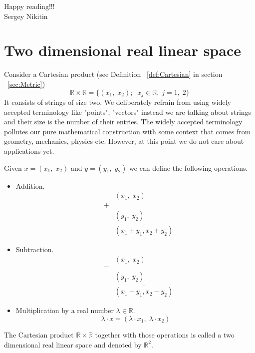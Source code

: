 \documentclass[color=black,11pt]{elegantpaper}
\begin{document}
Happy reading!!!\\
Sergey Nikitin 
 




\section{Two dimensional real linear space}
\label{sec:2space}
Consider a Cartesian product (see Definition ~\ref{def:Cartesian} in section ~\ref{sec:Metric}) 
$$
\mathbb{R} \times \mathbb{R} = \{(x_1,\;x_2);\;\;x_j \in \mathbb{R},\;j=1,\;2\}
$$  
It consists of strings of size two. We deliberately refrain from using widely accepted terminology like "points", "vectors"  instead we are talking about strings and their size is the number of their entries.  The widely accepted terminology pollutes our pure mathematical construction with some context that comes from geometry, mechanics, physics etc. However, at this point we do not care about applications yet.
\begin{definition}
\label{def:2space}
Given $x=(x_1,\;x_2)$ and $y=(y_1,\; y_2)$ we can define the following operations.
\begin{itemize}
\item[]Addition.
\begin{eqnarray*}
&& (x_1,\;x_2) \\
&+&\\
&& (y_1,\; y_2)\\
&&\overline{(x_1+y_1,x_2+y_2)}
\end{eqnarray*}
\item[]Subtraction.
\begin{eqnarray*}
&& (x_1,\;x_2) \\
&-&\\
&& (y_1,\; y_2)\\
&&\overline{(x_1-y_1,x_2-y_2)}
\end{eqnarray*}
\item[] Multiplication by a real number $\lambda \in \mathbb{R}.$
$$
\lambda \cdot x = (\lambda \cdot x_1,\; \lambda \cdot x_2)
$$
\end{itemize}
The Cartesian product $\mathbb{R} \times \mathbb{R}$ together with those operations is called a two dimensional real linear space and denoted by $ \mathbb{R}^2.$
\end{definition}
\end{document}

